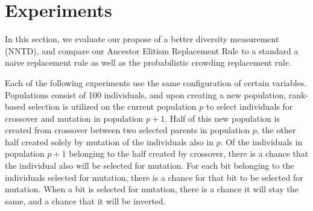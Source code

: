 \section{Experiments}
In this section, we evaluate our propose of a better diversity measurement (NNTD), and compare our Ancestor Elitism Replacement Rule to a standard a naive replacement rule as well as the probabilistic crowding replacement rule.

Each of the following experiments use the same configuration of certain variables. Populations consist of \num{100} individuals, and upon creating a new population, rank-based selection is utilized on the current population $p$ to select individuals for crossover and mutation in population $p + 1$. Half of this new population is created from crossover between two selected parents in population $p$, the other half created solely by mutation of the individuals also in $p$. Of the individuals in population $p + 1$ belonging to the half created by crossover, there is a  chance that the individual also will be selected for mutation. For each bit belonging to the individuals selected for mutation, there is a  chance for that bit to be selected for mutation. When a bit is selected for mutation, there is a  chance it will stay the same, and a  chance that it will be inverted.



